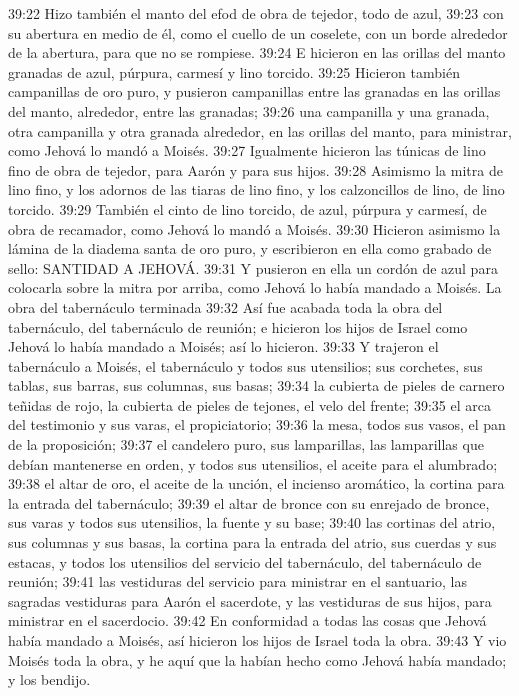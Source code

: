 39:22 Hizo también el manto del efod de obra de tejedor, todo de azul, 
39:23 con su abertura en medio de él, como el cuello de un coselete, con un borde alrededor de la abertura, para que no se rompiese. 
39:24 E hicieron en las orillas del manto granadas de azul, púrpura, carmesí y lino torcido. 
39:25 Hicieron también campanillas de oro puro, y pusieron campanillas entre las granadas en las orillas del manto, alrededor, entre las granadas; 
39:26 una campanilla y una granada, otra campanilla y otra granada alrededor, en las orillas del manto, para ministrar, como Jehová lo mandó a Moisés. 
39:27 Igualmente hicieron las túnicas de lino fino de obra de tejedor, para Aarón y para sus hijos. 
39:28 Asimismo la mitra de lino fino, y los adornos de las tiaras de lino fino, y los calzoncillos de lino, de lino torcido. 
39:29 También el cinto de lino torcido, de azul, púrpura y carmesí, de obra de recamador, como Jehová lo mandó a Moisés. 
39:30 Hicieron asimismo la lámina de la diadema santa de oro puro, y escribieron en ella como grabado de sello: SANTIDAD A JEHOVÁ. 
39:31 Y pusieron en ella un cordón de azul para colocarla sobre la mitra por arriba, como Jehová lo había mandado a Moisés. 
La obra del tabernáculo terminada  
39:32 Así fue acabada toda la obra del tabernáculo, del tabernáculo de reunión; e hicieron los hijos de Israel como Jehová lo había mandado a Moisés; así lo hicieron. 
39:33 Y trajeron el tabernáculo a Moisés, el tabernáculo y todos sus utensilios; sus corchetes, sus tablas, sus barras, sus columnas, sus basas; 
39:34 la cubierta de pieles de carnero teñidas de rojo, la cubierta de pieles de tejones, el velo del frente; 
39:35 el arca del testimonio y sus varas, el propiciatorio; 
39:36 la mesa, todos sus vasos, el pan de la proposición; 
39:37 el candelero puro, sus lamparillas, las lamparillas que debían mantenerse en orden, y todos sus utensilios, el aceite para el alumbrado; 
39:38 el altar de oro, el aceite de la unción, el incienso aromático, la cortina para la entrada del tabernáculo; 
39:39 el altar de bronce con su enrejado de bronce, sus varas y todos sus utensilios, la fuente y su base; 
39:40 las cortinas del atrio, sus columnas y sus basas, la cortina para la entrada del atrio, sus cuerdas y sus estacas, y todos los utensilios del servicio del tabernáculo, del tabernáculo de reunión; 
39:41 las vestiduras del servicio para ministrar en el santuario, las sagradas vestiduras para Aarón el sacerdote, y las vestiduras de sus hijos, para ministrar en el sacerdocio. 
39:42 En conformidad a todas las cosas que Jehová había mandado a Moisés, así hicieron los hijos de Israel toda la obra. 
39:43 Y vio Moisés toda la obra, y he aquí que la habían hecho como Jehová había mandado; y los bendijo. 
